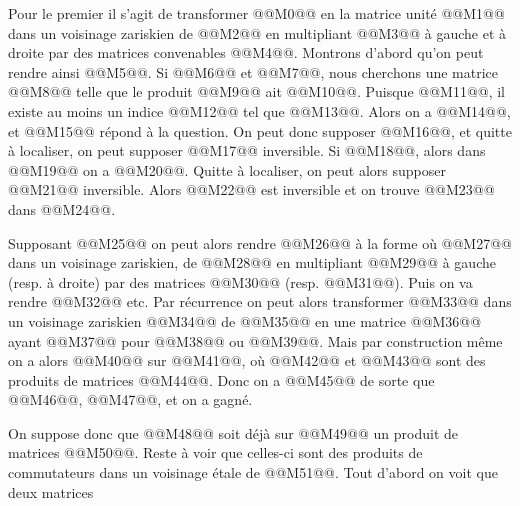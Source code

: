 
Pour le premier il s'agit de transformer @@M0@@ en la matrice unité @@M1@@ dans un voisinage zariskien de @@M2@@ en multipliant @@M3@@ à gauche et à droite par des matrices convenables @@M4@@. Montrons d'abord qu'on peut rendre ainsi @@M5@@. Si @@M6@@ et @@M7@@, nous cherchons une matrice @@M8@@ telle que le produit @@M9@@ ait @@M10@@. Puisque @@M11@@, il existe au moins un indice @@M12@@ tel que @@M13@@. Alors on a @@M14@@, et @@M15@@ répond à la question. On peut donc supposer @@M16@@, et quitte à localiser, on peut supposer @@M17@@ inversible. Si @@M18@@, alors dans @@M19@@ on a
@@M20@@. Quitte à localiser, on peut alors supposer @@M21@@ inversible. Alors @@M22@@ est inversible et on trouve @@M23@@ dans @@M24@@.

Supposant @@M25@@ on peut alors rendre @@M26@@ à la forme où
@@M27@@
dans un voisinage zariskien, de @@M28@@ en multipliant @@M29@@ à gauche (resp. à droite) par des matrices @@M30@@ (resp. @@M31@@). Puis on va rendre @@M32@@ etc. Par récurrence on peut alors transformer @@M33@@ dans un voisinage zariskien @@M34@@ de @@M35@@ en une matrice @@M36@@ ayant @@M37@@ pour @@M38@@ ou @@M39@@. Mais par construction même on a alors @@M40@@ sur @@M41@@, où @@M42@@ et @@M43@@ sont des produits de matrices @@M44@@. Donc on a
@@M45@@
de sorte que @@M46@@, @@M47@@, et on a gagné.

On suppose donc que @@M48@@ soit déjà sur @@M49@@ un produit de matrices @@M50@@.
Reste à voir que celles-ci sont des produits de commutateurs dans un voisinage étale de @@M51@@. Tout d'abord on voit que deux matrices

